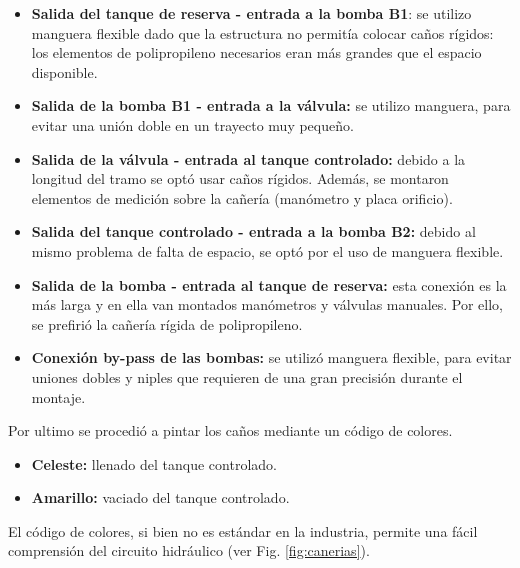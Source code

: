 \begin{itemize}
  \item \textbf{Salida del tanque de reserva - entrada a la bomba B1}:
  se utilizo manguera flexible dado que la estructura no permitía colocar caños
  rígidos: los elementos de polipropileno necesarios eran más grandes que el
  espacio disponible.

  \item \textbf{Salida de la bomba B1 - entrada a la válvula:}
  se utilizo manguera, para evitar una unión doble en un trayecto muy pequeño.
  
  \item \textbf{Salida de la válvula - entrada al tanque controlado:}
  debido a la longitud del tramo se optó usar caños rígidos.
  Además, se montaron elementos de medición sobre la cañería (manómetro y
  placa orificio).
  
  \item \textbf{Salida del tanque controlado - entrada a la bomba B2:}
  debido al mismo problema de falta de espacio, se optó por el uso de manguera
  flexible.
  
  \item \textbf{Salida de la bomba - entrada al tanque de reserva:}
  esta conexión es la más larga y en ella van montados manómetros y
  válvulas manuales. Por ello, se prefirió la cañería rígida de polipropileno.

  \item \textbf{Conexión by-pass de las bombas:}
  se utilizó manguera flexible, para evitar uniones dobles y
  niples que requieren de una gran precisión durante el montaje.
 \end{itemize}

Por ultimo se procedió a pintar los caños mediante un código de colores.
 \begin{itemize}
  \item {\color{Cerulean} \textbf{Celeste:}} llenado del tanque controlado.
  \item {\color{YellowOrange} \textbf{Amarillo:}} vaciado del tanque controlado.
 \end{itemize}
El código de colores, si bien no es estándar en la industria, permite una fácil
comprensión del circuito hidráulico (ver Fig. \ref{fig:canerias}).

